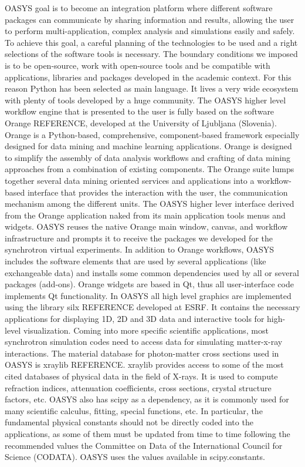 \documentclass{aip-cp}
\begin{document}
OASYS goal is to become an integration platform where different software packages can communicate by sharing information and results, allowing the user to perform multi-application, complex analysis and simulations easily and safely. To achieve this goal, a careful planning of the technologies to be used and a right selections of the software tools is necessary. The boundary conditions we imposed is to be open-source, work with open-source tools and be compatible with applications, libraries and packages developed in the academic context. For this reason Python has been selected as main language. It lives a very wide ecosystem with plenty of tools developed by a huge community. 
The OASYS higher level workflow engine that is presented to the user is fully based on the software Orange REFERENCE, developed at the University of Ljubljana (Slovenia). Orange is a Python-based, comprehensive, component-based framework especially designed for data mining and machine learning applications. Orange is designed to simplify the assembly of data analysis workflows and crafting of data mining approaches from a combination of existing components. The Orange suite lumps together several data mining oriented services and applications into a workflow-based interface that provides the interaction with the user, the communication mechanism among the different units. The OASYS higher lever interface derived from the Orange application naked  from its main application tools menus and widgets. OASYS reuses the native Orange main window, canvas, and workflow infrastructure and prompts it to receive the packages we developed for the synchrotron virtual experiments. In addition to Orange workflows, OASYS includes the software elements that are used by several applications (like exchangeable data) and installs some common dependencies used by all or several packages (add-ons). Orange widgets are based in Qt, thus all user-interface code implements Qt functionality. In OASYS all  high level graphics are implemented using the library silx REFERENCE developed at ESRF. It contains the necessary applications for displaying 1D, 2D and 3D data and interactive tools for high-level visualization. Coming into more specific scientific applications, most synchrotron simulation codes need to access data for simulating matter-x-ray interactions. The material database for photon-matter cross sections used in OASYS is xraylib REFERENCE. xraylib provides access to some of the most cited databases of physical data in the field of X-rays. It is used to compute refraction indices, attenuation coefficients, cross sections, crystal structure factors, etc.  OASYS also has scipy as a dependency, as it is commonly used for many scientific calculus, fitting, special functions, etc. In particular, the fundamental physical constants should not be directly coded into the applications, as some of them must be updated from time to time following the recommended values the Committee on Data of the International Council for Science (CODATA). OASYS uses the values available in scipy.constants.
\end{document}
